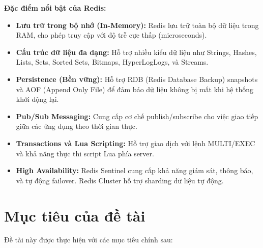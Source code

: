 \textbf{Đặc điểm nổi bật của Redis:}
\begin{itemize}
    \item \textbf{Lưu trữ trong bộ nhớ (In-Memory):} Redis lưu trữ toàn bộ dữ liệu trong RAM, cho phép truy cập với độ trễ cực thấp (microseconds).
    \item \textbf{Cấu trúc dữ liệu đa dạng:} Hỗ trợ nhiều kiểu dữ liệu như Strings, Hashes, Lists, Sets, Sorted Sets, Bitmaps, HyperLogLogs, và Streams.
    \item \textbf{Persistence (Bền vững):} Hỗ trợ RDB (Redis Database Backup) snapshots và AOF (Append Only File) để đảm bảo dữ liệu không bị mất khi hệ thống khởi động lại.
    \item \textbf{Pub/Sub Messaging:} Cung cấp cơ chế publish/subscribe cho việc giao tiếp giữa các ứng dụng theo thời gian thực.
    \item \textbf{Transactions và Lua Scripting:} Hỗ trợ giao dịch với lệnh MULTI/EXEC và khả năng thực thi script Lua phía server.
    \item \textbf{High Availability:} Redis Sentinel cung cấp khả năng giám sát, thông báo, và tự động failover. Redis Cluster hỗ trợ sharding dữ liệu tự động.
\end{itemize}

\section{Mục tiêu của đề tài}

Đề tài này được thực hiện với các mục tiêu chính sau:

